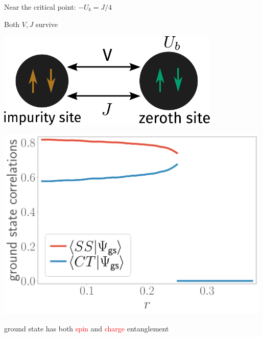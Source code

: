 \documentclass[11pt,aspectratio=169]{beamer}
\newcommand{\focus}[1]{\textcolor{red}{#1}}
\begin{document}
\begin{frame}{Near the critical point: \(-U_b = J/4 \)}

\begin{minipage}{0.5\textwidth}

\centering

Both \(V,J\) survive

\vspace*{20pt}

\includegraphics[width=0.8\textwidth]{figures/spin-charge.pdf}

\end{minipage}
\begin{minipage}{0.49\textwidth}
\centering
\includegraphics[width=0.99\textwidth]{figures/corrs_gs.pdf}

\end{minipage}

\vspace*{20pt}

ground state has both \focus{spin} and \focus{charge} entanglement

\end{frame}
\end{document}

